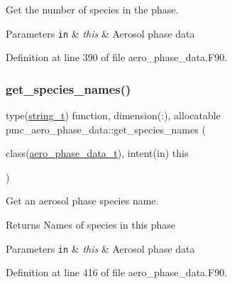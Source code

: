 Get the number of species in the phase. 


\begin{DoxyParams}[1]{Parameters}
\mbox{\tt in}  & {\em this} & Aerosol phase data \\
\hline
\end{DoxyParams}


Definition at line 390 of file aero\+\_\+phase\+\_\+data.\+F90.

\mbox{\label{namespacepmc__aero__phase__data_a0bdb92ba2634d7c4b8d15b63baee4311}} 
\subsubsection{\texorpdfstring{get\+\_\+species\+\_\+names()}{get\_species\_names()}}
{\footnotesize\ttfamily type(\mbox{\hyperlink{structpmc__util_1_1string__t}{string\+\_\+t}}) function, dimension(\+:), allocatable pmc\+\_\+aero\+\_\+phase\+\_\+data\+::get\+\_\+species\+\_\+names (\begin{DoxyParamCaption}\item[{class(\mbox{\hyperlink{structpmc__aero__phase__data_1_1aero__phase__data__t}{aero\+\_\+phase\+\_\+data\+\_\+t}}), intent(in)}]{this }\end{DoxyParamCaption})\hspace{0.3cm}{\ttfamily [private]}}



Get an aerosol phase species name. 

\begin{DoxyReturn}{Returns}
Names of species in this phase
\end{DoxyReturn}

\begin{DoxyParams}[1]{Parameters}
\mbox{\tt in}  & {\em this} & Aerosol phase data \\
\hline
\end{DoxyParams}


Definition at line 416 of file aero\+\_\+phase\+\_\+data.\+F90.

\mbox{\label{namespacepmc__aero__phase__data_afe51744f24e245997c36e00d63d577cf}} 
